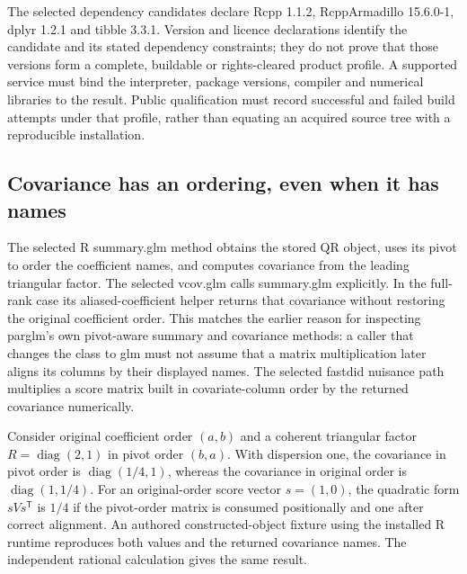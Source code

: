 The selected dependency candidates declare Rcpp 1.1.2, RcppArmadillo 15.6.0-1, dplyr 1.2.1 and tibble 3.3.1. Version and licence declarations identify the candidate and its stated dependency constraints; they do not prove that those versions form a complete, buildable or rights-cleared product profile. A supported service must bind the interpreter, package versions, compiler and numerical libraries to the result. Public qualification must record successful and failed build attempts under that profile, rather than equating an acquired source tree with a reproducible installation.~\citep{exec29_panel_runtime_sources}

\subsection{Covariance has an ordering, even when it has names}

The selected R summary.glm method obtains the stored QR object, uses its pivot to order the coefficient names, and computes covariance from the leading triangular factor. The selected vcov.glm calls summary.glm explicitly. In the full-rank case its aliased-coefficient helper returns that covariance without restoring the original coefficient order. This matches the earlier reason for inspecting parglm's own pivot-aware summary and covariance methods: a caller that changes the class to glm must not assume that a matrix multiplication later aligns its columns by their displayed names. The selected fastdid nuisance path multiplies a score matrix built in covariate-column order by the returned covariance numerically.~\citep{exec28_panel_estimator_sources,exec29_panel_inference_sources,exec29_panel_runtime_sources}

Consider original coefficient order $(a,b)$ and a coherent triangular factor $R=\operatorname{diag}(2,1)$ in pivot order $(b,a)$. With dispersion one, the covariance in pivot order is $\operatorname{diag}(1/4,1)$, whereas the covariance in original order is $\operatorname{diag}(1,1/4)$. For an original-order score vector $s=(1,0)$, the quadratic form $sVs^{\mathsf T}$ is $1/4$ if the pivot-order matrix is consumed positionally and one after correct alignment. An authored constructed-object fixture using the installed R runtime reproduces both values and the returned covariance names. The independent rational calculation gives the same result.~\citep{exec29_panel_runtime_reference}

